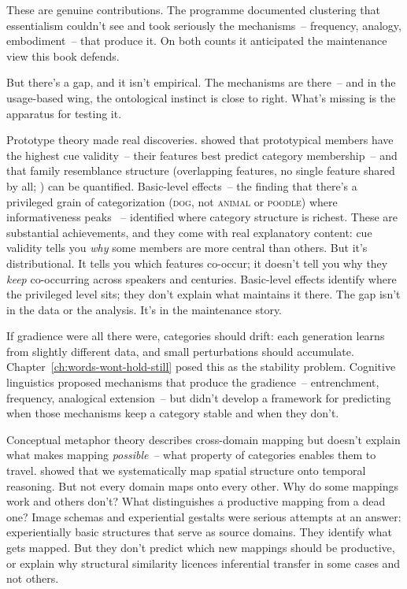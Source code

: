 These are genuine contributions. The programme documented clustering that essentialism couldn't see and took seriously the mechanisms~-- frequency, analogy, embodiment~-- that produce it. On both counts it anticipated the maintenance view this book defends.

But there's a gap, and it isn't empirical. The mechanisms are there~-- and in the usage-based wing, the ontological instinct is close to right. What's missing is the apparatus for testing it.

Prototype theory made real discoveries. \textcite{roschmervis1975} showed that prototypical members have the highest cue validity~-- their features best predict category membership~-- and that family resemblance structure (overlapping features, no single feature shared by all; \citealp{wittgenstein1953}) can be quantified. Basic-level effects~-- the finding that there's a privileged grain of categorization (\textsc{dog}, not \textsc{animal} or \textsc{poodle}) where informativeness peaks \citep{rosch1976}~-- identified where category structure is richest. These are substantial achievements, and they come with real explanatory content: cue validity tells you \emph{why} some members are more central than others. But it's distributional. It tells you which features co-occur; it doesn't tell you why they \emph{keep} co-occurring across speakers and centuries. Basic-level effects identify where the privileged level sits; they don't explain what maintains it there. The gap isn't in the data or the analysis. It's in the maintenance story.

If gradience were all there were, categories should drift: each generation learns from slightly different data, and small perturbations should accumulate. Chapter~\ref{ch:words-wont-hold-still} posed this as the stability problem. Cognitive linguistics proposed mechanisms that produce the gradience~-- entrenchment, frequency, analogical extension~-- but didn't develop a framework for predicting when those mechanisms keep a category stable and when they don't.

Conceptual metaphor theory describes cross-domain mapping but doesn't explain what makes mapping \emph{possible}~-- what property of categories enables them to travel. \textcite{lakoff1980} showed that we systematically map spatial structure onto temporal reasoning. But not every domain maps onto every other. Why do some mappings work and others don't? What distinguishes a productive mapping from a dead one? Image schemas and experiential gestalts were serious attempts at an answer: experientially basic structures that serve as source domains. They identify what gets mapped. But they don't predict which new mappings should be productive, or explain why structural similarity licences inferential transfer in some cases and not others.


